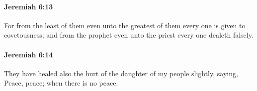 		\paragraph{Jeremiah 6:13} %
			\label{JEREMIAH-6-13}

			For from the least of them even unto the greatest of them every one is given to covetousness; and from the prophet even unto the priest every one dealeth falsely.


		\paragraph{Jeremiah 6:14} %
			\label{JEREMIAH-6-14}

			They have healed also the hurt of the daughter of my people slightly, saying, Peace, peace; when there is no peace.


